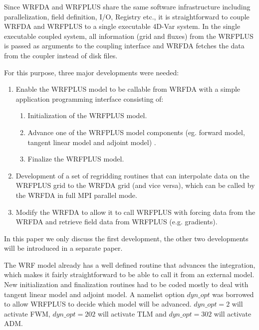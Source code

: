 \documentclass[12pt]{article}
\begin{document}
Since WRFDA and WRFPLUS share the same software infrastructure including parallelization, field definition, I/O, Registry etc., it is straightforward to couple WRFDA and WRFPLUS to a single executable 4D-Var system.  In the single executable coupled system, all information (grid and fluxes) from the WRFPLUS is passed as arguments to the coupling interface and WRFDA fetches the data from the coupler instead of disk files.

For this purpose, three major developments were needed:
\begin{enumerate}
        \item Enable the WRFPLUS model to be callable from WRFDA with a simple application programming interface consisting of:
        \begin{enumerate}
		\item Initialization of the WRFPLUS model. 
		\item Advance one of the WRFPLUS model components (eg. forward model, tangent linear model and adjoint model) . 
		\item Finalize the WRFPLUS model.
	\end{enumerate}
	\item Development of a set of regridding routines that can interpolate data on the WRFPLUS grid to the WRFDA grid (and vice versa), which can be called by the WRFDA in full MPI parallel mode. 
	\item Modify the WRFDA to allow it to call WRFPLUS with forcing data from the WRFDA and retrieve field data from WRFPLUS (e.g. gradients).
\end{enumerate}
In this paper we only discuss the first development, the other two developments will be introduced in a separate paper. 

The WRF model already has a well defined routine that advances the integration, which makes it fairly straightforward to be able to call it from an external model. New initialization and finalization routines had to be coded mostly to deal with tangent linear model and adjoint model. A namelist option $dyn\_opt$ was borrowed to allow WRFPLUS to decide which model will be advanced. $dyn\_opt=2$ will activate FWM, $dyn\_opt=202$ will activate TLM and   $dyn\_opt=302$ will activate ADM.
\end{document}
